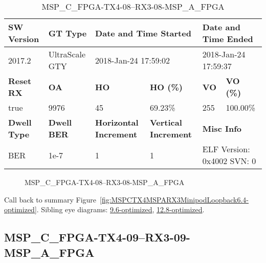 \begin{table}[h]
\centering
\caption{MSP\_C\_FPGA-TX4-08--RX3-08-MSP\_A\_FPGA}
\label{tab:MSPCFPGATX408RX308MSPAFPGA6.4-optimized}
\begin{tabular}{@{}|l|l|l|l|l|l|@{}}
\toprule
\textbf{SW Version}                & \textbf{GT Type}   & \multicolumn{2}{l|}{\textbf{Date and Time Started}}            & \multicolumn{2}{l|}{\textbf{Date and Time Ended}}        \\ \midrule
2017.2                       & UltraScale GTY          & \multicolumn{2}{l|}{2018-Jan-24 17:59:02}                   & \multicolumn{2}{l|}{2018-Jan-24 17:59:37}               \\ \midrule
\textbf{Reset RX}                  & \textbf{OA} & \textbf{HO}   & \textbf{HO (\%)} & \textbf{VO} & \textbf{VO (\%)} \\ \midrule
true & 9976        & 45          & 69.23\%        & 255        & 100.00\%       \\ \midrule
\textbf{Dwell Type}                & \textbf{Dwell BER} & \textbf{Horizontal Increment} & \textbf{Vertical Increment}    & \multicolumn{2}{l|}{\textbf{Misc Info}}                  \\ \midrule
BER                            & 1e-7        & 1        & 1           & \multicolumn{2}{l|}{ELF Version: 0x4002 SVN: 0}                         \\ \bottomrule
\end{tabular}
\end{table}

\begin{figure}[h]
\caption{MSP\_C\_FPGA-TX4-08--RX3-08-MSP\_A\_FPGA} \label{fig:MSPCFPGATX408RX308MSPAFPGA6.4-optimized}
\end{figure}

Call back to summary Figure~\ref{fig:MSPCTX4MSPARX3MinipodLoopback6.4-optimized}.
Sibling eye diagrams: \hyperref[sec:MSPCFPGATX408RX308MSPAFPGA9.6-optimized]{9.6-optimized}, \hyperref[sec:MSPCFPGATX408RX308MSPAFPGA12.8-optimized]{12.8-optimized}.

\clearpage
\newpage


\subsection{MSP\_C\_FPGA-TX4-09--RX3-09-MSP\_A\_FPGA}\label{sec:MSPCFPGATX409RX309MSPAFPGA6.4-optimized}

